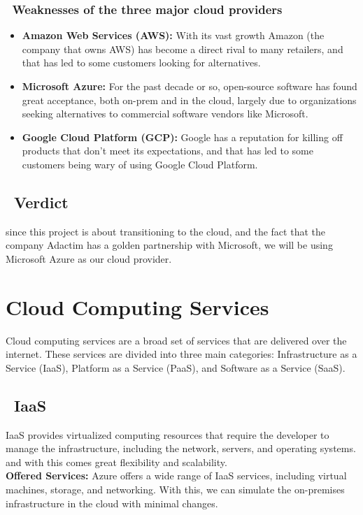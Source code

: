 \subsubsection*{ \textbullet\ Weaknesses of the three major cloud providers \cite{BigCloud3}}
\begin{itemize}
    \item \textbf{Amazon Web Services (AWS):} With its vast growth Amazon (the company that owns AWS) has become a direct rival to many retailers, and that has led to some customers looking for alternatives.
    \item \textbf{Microsoft Azure:} For the past decade or so, open-source software has found great acceptance, both on-prem and in the cloud, largely due to organizations seeking alternatives to commercial software vendors like Microsoft.
    \item \textbf{Google Cloud Platform (GCP):} Google has a reputation for killing off products that don't meet its expectations, and that has led to some customers being wary of using Google Cloud Platform.
\end{itemize}
\subsection*{ \textbullet\ Verdict}
since this project is about transitioning to the cloud, and the fact that the company Adactim has a golden partnership with Microsoft, we will be using Microsoft Azure as our cloud provider.

\section{Cloud Computing Services}
Cloud computing services are a broad set of services that are delivered over the internet. These services are divided into three main categories: Infrastructure as a Service (IaaS), Platform as a Service (PaaS), and Software as a Service (SaaS).
\subsection*{ \textbullet\ IaaS}
\noindent
IaaS provides virtualized computing resources that require the developer to manage the infrastructure, including the network, servers, and operating systems. and with this comes great flexibility and scalability.
\noindent \\
\textbf{Offered Services:} Azure offers a wide range of IaaS services, including virtual machines, storage, and networking. With this, we can simulate the on-premises infrastructure in the cloud with minimal changes.
